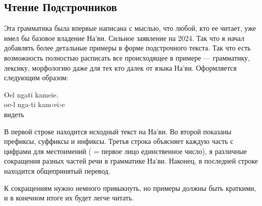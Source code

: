 \subsection{Чтение Подстрочников}
Эта грамматика была впервые написана с мыслью, что любой, кто ее читает,
уже имел бы базовое владение На'ви. Сильное заявление на 2024. Так что я начал добавлять более детальные примеры в форме подстрочного текста.  Так что есть возможность полностью расписать все происходящее в примере — грамматику, лексику, морфологию даже для тех кто далек от языка На'ви. Оформляется следующим образом:

\begin{interlin}
 \glll Oel ngati kameie. \\
     oe-l nga-ti kam‹ei›e \\
       видеть \\
\end{interlin}

\noindent В первой строке находится исходный текст на На'ви.  Во второй показаны префиксы, суффиксы и инфиксы.  Третья строка объясняет каждую часть с цифрами для местоимений ( = первое лицо
единственное число), я различные сокращения разных частей речи в грамматике На'ви.  Наконец, в последней строке находится общепринятый перевод. 

К сокращениям нужно немного привыкнуть, но примеры должны быть краткими, и в конечном итоге их будет легче читать.

